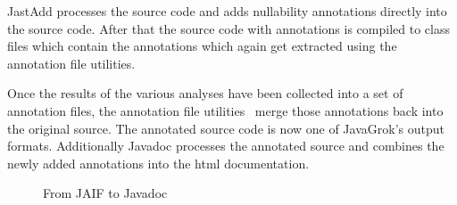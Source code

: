 JastAdd processes the source code and adds nullability annotations
directly into the source code. After that the source code with annotations
is compiled to class files which contain the annotations which again 
get extracted using the annotation file utilities.

Once the results of the various analyses have been collected into a set of
annotation files, the annotation file utilities~\cite{AFU} merge
those annotations back into the original source. The annotated source
code is now one of JavaGrok's output formats. Additionally Javadoc processes
the annotated source and combines the newly added annotations into the html
documentation.

\begin{figure*}
\centering
{}
\caption{From JAIF to Javadoc}
\label{fig:from_jaif_to_javadoc}
\end{figure*}